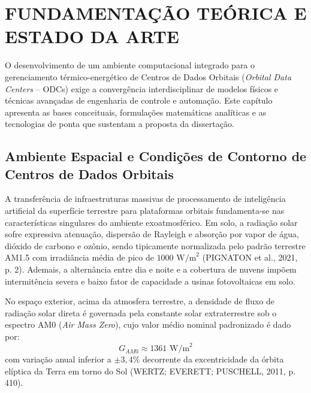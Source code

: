 \section{FUNDAMENTAÇÃO TEÓRICA E ESTADO DA ARTE}

O desenvolvimento de um ambiente computacional integrado para o gerenciamento térmico-energético de Centros de Dados Orbitais (\textit{Orbital Data Centers} -- ODCs) exige a convergência interdisciplinar de modelos físicos e técnicas avançadas de engenharia de controle e automação. Este capítulo apresenta as bases conceituais, formulações matemáticas analíticas e as tecnologias de ponta que sustentam a proposta da dissertação.

\subsection{Ambiente Espacial e Condições de Contorno de Centros de Dados Orbitais}

A transferência de infraestruturas massivas de processamento de inteligência artificial da superfície terrestre para plataformas orbitais fundamenta-se nas características singulares do ambiente exoatmosférico. Em solo, a radiação solar sofre expressiva atenuação, dispersão de Rayleigh e absorção por vapor de água, dióxido de carbono e ozônio, sendo tipicamente normalizada pelo padrão terrestre AM1.5 com irradiância média de pico de $1000\text{ W/m}^2$ (PIGNATON et al., 2021, p. 2). Ademais, a alternância entre dia e noite e a cobertura de nuvens impõem intermitência severa e baixo fator de capacidade a usinas fotovoltaicas em solo.

No espaço exterior, acima da atmosfera terrestre, a densidade de fluxo de radiação solar direta é governada pela constante solar extraterrestre sob o espectro AM0 (\textit{Air Mass Zero}), cujo valor médio nominal padronizado é dado por:
\begin{equation}
    G_{AM0} \approx 1361\text{ W/m}^2
\end{equation}
com variação anual inferior a $\pm 3{,}4\%$ decorrente da excentricidade da órbita elíptica da Terra em torno do Sol (WERTZ; EVERETT; PUSCHELL, 2011, p. 410).

